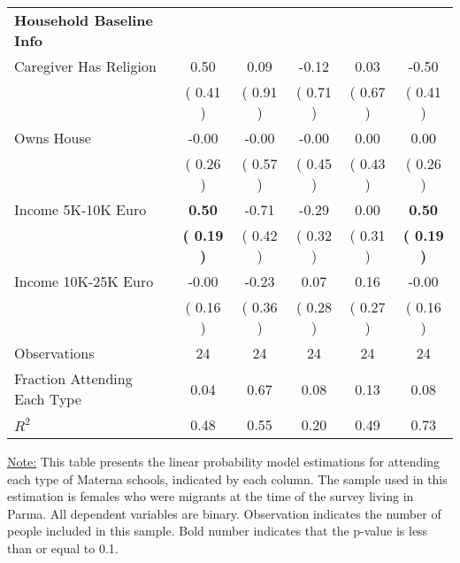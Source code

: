 \begin{table}[H]
{\begin{tabular}{lccccc}
\midrule
\textbf{Household Baseline Info} \\
\quad Caregiver Has Religion &      0.50 &      0.09 &     -0.12 &      0.03 &     -0.50 \\
\quad  & (     0.41 ) & (     0.91 )  & (     0.71 )  & (     0.67 ) & (     0.41 ) \\
\quad Owns House &     -0.00 &     -0.00 &     -0.00 &      0.00 &      0.00 \\
\quad  & (     0.26 ) & (     0.57 )  & (     0.45 )  & (     0.43 ) & (     0.26 ) \\
\quad Income 5K-10K Euro & \textbf{     0.50} &     -0.71 &     -0.29 &      0.00 & \textbf{     0.50} \\
\quad  & \textbf{(     0.19 )} & (     0.42 )  & (     0.32 )  & (     0.31 ) & \textbf{(     0.19 )} \\
\quad Income 10K-25K Euro &     -0.00 &     -0.23 &      0.07 &      0.16 &     -0.00 \\
\quad  & (     0.16 ) & (     0.36 )  & (     0.28 )  & (     0.27 ) & (     0.16 ) \\
\midrule
Observations & 24 & 24 & 24 & 24 & 24 \\
Fraction Attending Each Type &      0.04 &      0.67 &      0.08 &      0.13 &      0.08 \\
\midrule
$ R^2$ &      0.48 &      0.55 &      0.20 &      0.49 &      0.73 \\
\bottomrule
\end{tabular}}
\end{table}
\begin{footnotesize}
\noindent\underline{Note:} This table presents the linear probability model estimations for attending each type of Materna schools, indicated by each column. The sample used in this estimation is females who were migrants at the time of the survey living in Parma. All dependent variables are binary. Observation indicates the number of people included in this sample. Bold number indicates that the p-value is less than or equal to 0.1.
\end{footnotesize}

